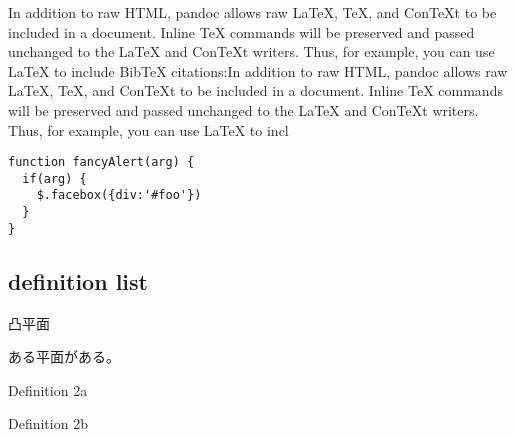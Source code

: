 In addition to raw HTML, pandoc allows raw LaTeX, TeX, and ConTeXt to be
included in a document. Inline TeX commands will be preserved and passed
unchanged to the LaTeX and ConTeXt writers. Thus, for example, you can
use LaTeX to include BibTeX citations:In addition to raw HTML, pandoc
allows raw LaTeX, TeX, and ConTeXt to be included in a document. Inline
TeX commands will be preserved and passed unchanged to the LaTeX and
ConTeXt writers. Thus, for example, you can use LaTeX to incl

\begin{lstlisting}
function fancyAlert(arg) {
  if(arg) {
    $.facebox({div:'#foo'})
  }
}
\end{lstlisting}

\subsection{definition list}\label{definition-list}

\begin{description}
\tightlist
\item[定義]
凸平面
\end{description}

ある平面がある。

\begin{description}
\tightlist
\item[Term 2]
Definition 2a

Definition 2b
\end{description}
